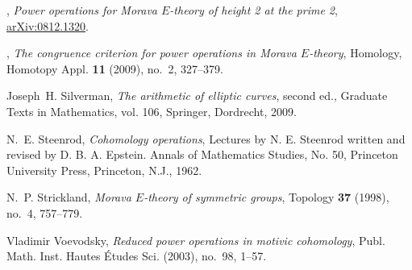 \documentclass{gtpart}
\theoremstyle{definition}
\theoremstyle{remark}
\begin{document}
\begin{thebibliography}
\bysame, \emph{Power operations for {M}orava ${E}$-theory of height 2 at the
  prime 2}, \href{http://arxiv.org/abs/0812.1320}{arXiv:0812.1320}.

\bysame, \emph{The congruence criterion for power operations in {M}orava
  {$E$}-theory}, Homology, Homotopy Appl. \textbf{11} (2009), no.~2, 327--379.

Joseph~H. Silverman, \emph{The arithmetic of elliptic curves}, second ed.,
  Graduate Texts in Mathematics, vol. 106, Springer, Dordrecht, 2009.

N.~E. Steenrod, \emph{Cohomology operations}, Lectures by N. E. Steenrod
  written and revised by D. B. A. Epstein. Annals of Mathematics Studies, No.
  50, Princeton University Press, Princeton, N.J., 1962. 

N.~P. Strickland, \emph{Morava {$E$}-theory of symmetric groups}, Topology
  \textbf{37} (1998), no.~4, 757--779. 

Vladimir Voevodsky, \emph{Reduced power operations in motivic cohomology},
  Publ. Math. Inst. Hautes \'Etudes Sci. (2003), no.~98, 1--57. 

\end{thebibliography}
\end{document}
